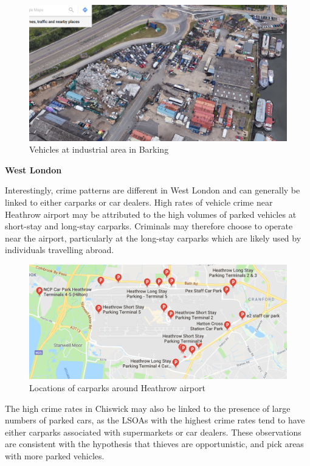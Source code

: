 \documentclass[]{article}
\theoremstyle{definition}
\theoremstyle{definition}
\theoremstyle{definition}
\theoremstyle{remark}
\begin{document}
\begin{figure}
\centering
\includegraphics{pictures/Barkingscrapyard.png}
\caption{Vehicles at industrial area in Barking}
\end{figure}

\textbf{West London}

Interestingly, crime patterns are different in West London and can
generally be linked to either carparks or car dealers. High rates of
vehicle crime near Heathrow airport may be attributed to the high
volumes of parked vehicles at short-stay and long-stay carparks.
Criminals may therefore choose to operate near the airport, particularly
at the long-stay carparks which are likely used by individuals
travelling abroad.

\begin{figure}
\centering
\includegraphics{pictures/heathrowcarpark.png}
\caption{Locations of carparks around Heathrow airport}
\end{figure}

The high crime rates in Chiswick may also be linked to the presence of
large numbers of parked cars, as the LSOAs with the highest crime rates
tend to have either carparks associated with supermarkets or car
dealers. These observations are consistent with the hypothesis that
thieves are opportunistic, and pick areas with more parked vehicles.
\end{document}

